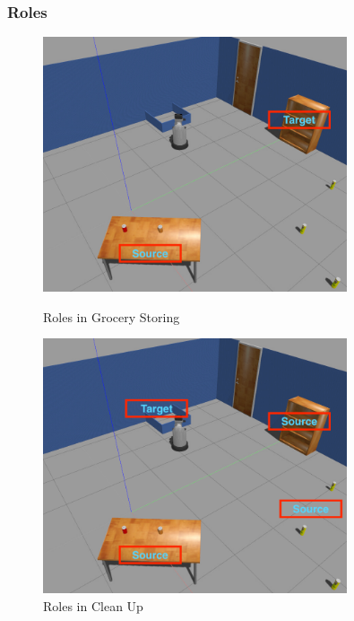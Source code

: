 \documentclass[main.tex]{subfiles}
\begin{document}
\subsubsection{Roles}

\begin{figure}
    \centering
        \includegraphics[width=0.8\textwidth]{pictures/knowledge_roles_gr.png}
        \caption{Roles in Grocery Storing}
        \label{fig:kn_ro_gr}
        \includegraphics[width=0.8\textwidth]{pictures/knowledge_roles_cl.png}
        \caption{Roles in Clean Up}
        \label{fig:kn_ro_cl}
\end{figure}
\end{document}
